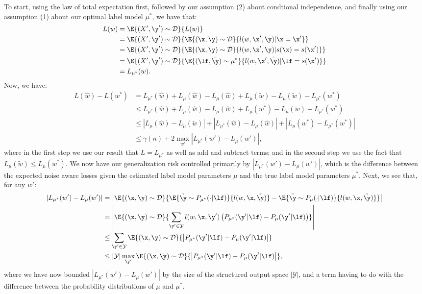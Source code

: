 \documentclass[letterpaper]{article}
\begin{document}
\begin{appendix}
To start, using the law of total expectation first, followed by our assumption (2) about condtional independence, and finally using our assumption (1) about our optimal label model $\mu^*$, we have that:
\begin{align*}
	L(w)
	&=
	\E{(X', \y') \sim \mathcal{D}}{ L(w) }\\
	&=
	\E{(X', \y') \sim \mathcal{D}}{ 
		\E{(\x,\y) \sim \mathcal{D}}{ l(w, \x', \y) | \x = \x'} 
	}\\
	&=
	\E{(X', \y') \sim \mathcal{D}}{ 
		\E{(\x,\y) \sim \mathcal{D}}{ l(w, \x', \y) | s(\x) = s(\x')} 
	}\\
	&=
	\E{(X', \y') \sim \mathcal{D}}{ 
		\E{(\lf, \tilde{\y}) \sim \mu^*}{
			l(w, \x', \tilde{\y}) | \lf = s(\x')
		} 
	}\\
	&=
	L_{\mu^*}(w).
\end{align*}
Now, we have:
\begin{align*}
	L(\hat{w}) - L(w^*)
	&=
	L_{\mu^*}(\hat{w})
	+ L_\mu(\hat{w}) - L_\mu(\hat{w})
	+ L_\mu(\tilde{w}) - L_\mu(\tilde{w})
	- L_{\mu^*}(w^*) \\
	&\leq
	L_{\mu^*}(\hat{w})
	+ L_\mu(\hat{w}) - L_\mu(\hat{w})
	+ L_\mu(w^*) - L_\mu(\tilde{w})
	- L_{\mu^*}(w^*) \\
	&\leq
	| L_\mu(\hat{w}) - L_\mu(\tilde{w}) |
	+ | L_{\mu^*}(\hat{w}) - L_\mu(\hat{w}) |
	+ | L_\mu(w^*) - L_{\mu^*}(w^*) | \\
	&\leq
	\gamma(n)
	+ 2\max_{w'} | L_{\mu^*}(w') - L_\mu(w') |,
\end{align*}
where in the first step we use our result that $L = L_{\mu^*}$ as well as add and subtract terms; and in the second step we use the fact that $L_\mu(\tilde{w}) \leq L_\mu(w^*)$.
We now have our generalization risk controlled primarily by $| L_{\mu^*}(w') - L_\mu(w') |$, which is the difference between the expected noise aware losses given the estimated label model parameters $\mu$ and the true label model parameters $\mu^*$.
Next, we see that, for any $w'$:
\begin{align*}
	| L_{\mu^*}(w') - L_{\mu}(w') |
	&=
	\left|
		\E{(\x,\y) \sim \mathcal{D}}{ 
			\E{\tilde{\y} \sim P_{\mu^*}(\cdot|\lf)}{ 
				l(w, \x, \tilde{\y}) 
			}
		    - \E{\tilde{\y} \sim P_\mu(\cdot|\lf)}{
		    	l(w, \x, \tilde{\y}) 
		    }
		}
	\right|\\
	&=
	\left|
		\E{(\x,\y) \sim \mathcal{D}}{
			\sum_{\y' \in \mathcal{Y}}
				l(w, \x, \y')
				\left(
					P_{\mu^*}(\y'|\lf) - P_{\mu}(\y'|\lf)
				\right)
		}
	\right|\\
	&\leq
	\sum_{\y' \in \mathcal{Y}}
		\E{(\x,\y) \sim \mathcal{D}}{
			\left| P_{\mu^*}(\y'|\lf) - P_{\mu}(\y'|\lf) \right|
		}\\
	&\leq
	|\mathcal{Y}| \max_{\y'}
		\E{(\x,\y) \sim \mathcal{D}}{
			\left| P_{\mu^*}(\y'|\lf) - P_{\mu}(\y'|\lf) \right|
		},
\end{align*}
where we have now bounded $| L_{\mu^*}(w') - L_{\mu}(w') |$ by the size of the structured output space $|\mathcal{Y}|$, and a term having to do with the difference between the probability distributions of $\mu$ and $\mu^*$.


\end{appendix}
\end{document}
